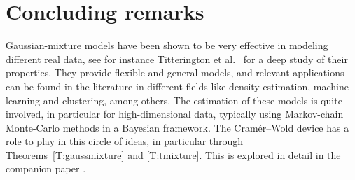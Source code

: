 \documentclass[11pt]{amsart}
\theoremstyle{plain}
\theoremstyle{remark}
\begin{document}
	
	
\section{Concluding remarks}\label{S:conclusion}

Gaussian-mixture models have been shown to be very effective in modeling different real data, see for instance Titterington et al.\ \cite{TSM85} for a deep study of their properties. They provide flexible and general models, and relevant applications can be found in the literature in different fields like density estimation, machine learning and clustering,  among others. The estimation of these models is quite involved, in particular for high-dimensional data, 
typically using Markov-chain Monte-Carlo methods in a Bayesian framework.
The Cram\'er--Wold device has a role to play in this circle of ideas, in particular through
Theorems~\ref{T:gaussmixture} and \ref{T:tmixture}. 
This is explored in detail in the companion paper \cite{FMR25}.	





\end{document}
